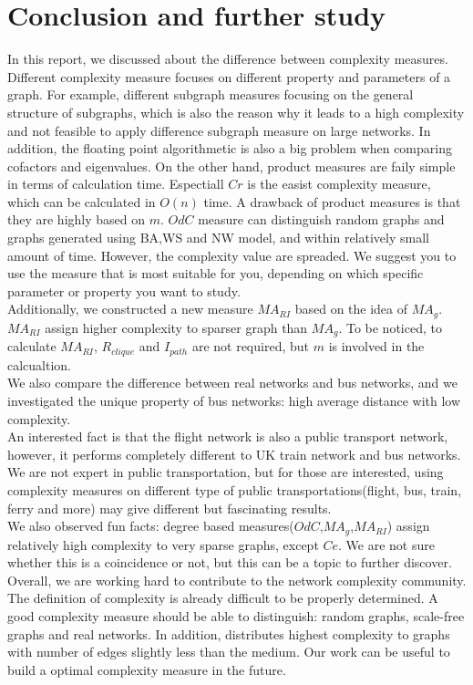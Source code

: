 \documentclass[12pt]{article}
\begin{document}
\section{Conclusion and further study}
In this report, we discussed about the difference between complexity measures. Different complexity measure focuses on different property and parameters of a graph. For example, different subgraph measures focusing on the general structure of subgraphs, which is also the reason why it leads to a high complexity and not feasible to apply difference subgraph measure on large networks. In addition, the floating point algorithmetic is also a big problem when comparing cofactors and eigenvalues.
On the other hand, product measures are faily simple in terms of calculation time. Espectiall $Cr$ is the easist complexity measure, which can be calculated in $O(n)$ time\cite{KIM20082637}. A drawback of product measures is that they are highly based on $m$.
$OdC$ measure can distinguish random graphs and graphs generated using BA,WS and NW model, and within relatively small amount of time. However, the complexity value are spreaded. We suggest you to use the measure that is most suitable for you, depending on which specific parameter or property you want to study.\\
Additionally, we constructed a new measure $MA_{RI}$ based on the idea of $MA_g$. $MA_{RI}$ assign higher complexity to sparser graph than $MA_g$. To be noticed, to calculate $MA_{RI}$, $R_{clique}$ and $I_{path}$ are not required, but $m$ is involved in the calcualtion.\\
We also compare the difference between real networks and bus networks, and we investigated the unique property of bus networks: high average distance with low complexity.\\
An interested fact is that the flight network is also a public transport network, however, it performs completely different to UK train network and bus networks. We are not expert in public transportation, but for those are interested, using complexity measures on different type of public transportations(flight, bus, train, ferry and more) may give different but fascinating results.\\
We also observed fun facts: degree based measures($OdC$,$MA_g$,$MA_{RI}$) assign relatively high complexity to very sparse graphs, except $Ce$. We are not sure whether this is a coincidence or not, but this can be a topic to further discover.\\
Overall, we are working hard to contribute to the network complexity community. The definition of complexity is already difficult to be properly determined. A good complexity measure should be able to distinguish: random graphs, scale-free graphs and real networks. In addition, distributes highest complexity to graphs with number of edges slightly less than the medium. Our work can be useful to build a optimal complexity measure in the future.

\printbibliography
\end{document}
